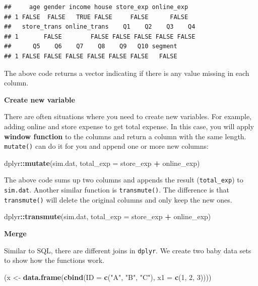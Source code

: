 \documentclass[12pt,]{krantz}
\makeatletter
\newenvironment{Shaded}{\begin{snugshade}}{\end{snugshade}}
\newcommand{\DataTypeTok}[1]{\textcolor[rgb]{0.27,0.27,0.27}{#1}}
\newcommand{\DecValTok}[1]{\textcolor[rgb]{0.06,0.06,0.06}{#1}}
\newcommand{\KeywordTok}[1]{\textcolor[rgb]{0.27,0.27,0.27}{\textbf{#1}}}
\newcommand{\NormalTok}[1]{#1}
\newcommand{\OperatorTok}[1]{\textcolor[rgb]{0.43,0.43,0.43}{\textbf{#1}}}
\newcommand{\StringTok}[1]{\textcolor[rgb]{0.5,0.5,0.5}{#1}}
\newenvironment{kframe}{%
\medskip{}
\setlength{\fboxsep}{.8em}
 \def\at@end@of@kframe{}%
 \ifinner\ifhmode%
  \def\at@end@of@kframe{\end{minipage}}%
  \begin{minipage}{\columnwidth}%
 \fi\fi%
 \def\FrameCommand##1{\hskip\@totalleftmargin \hskip-\fboxsep
 \colorbox{shadecolor}{##1}\hskip-\fboxsep
     \hskip-\linewidth \hskip-\@totalleftmargin \hskip\columnwidth}%
 \MakeFramed {\advance\hsize-\width
   \@totalleftmargin\z@ \linewidth\hsize
   \@setminipage}}%
 {\par\unskip\endMakeFramed%
 \at@end@of@kframe}
\renewenvironment{Shaded}{\begin{kframe}}{\end{kframe}}
\makeatother
\begin{document}
\begin{verbatim}
##     age gender income house store_exp online_exp
## 1 FALSE  FALSE   TRUE FALSE     FALSE      FALSE
##   store_trans online_trans    Q1    Q2    Q3    Q4
## 1       FALSE        FALSE FALSE FALSE FALSE FALSE
##      Q5    Q6    Q7    Q8    Q9   Q10 segment
## 1 FALSE FALSE FALSE FALSE FALSE FALSE   FALSE
\end{verbatim}

The above code returns a vector indicating if there is any value missing in each column.

\textbf{Create new variable}

There are often situations where you need to create new variables. For example, adding online and store expense to get total expense. In this case, you will apply \textbf{window function} to the columns and return a column with the same length. \texttt{mutate()} can do it for you and append one or more new columns:

\begin{Shaded}
\begin{Highlighting}[]
\NormalTok{dplyr}\OperatorTok{::}\KeywordTok{mutate}\NormalTok{(sim.dat, }\DataTypeTok{total_exp =}\NormalTok{ store_exp }\OperatorTok{+}\StringTok{ }\NormalTok{online_exp)}
\end{Highlighting}
\end{Shaded}

The above code sums up two columns and appends the result (\texttt{total\_exp}) to \texttt{sim.dat}. Another similar function is \texttt{transmute()}. The difference is that \texttt{transmute()} will delete the original columns and only keep the new ones.

\begin{Shaded}
\begin{Highlighting}[]
\NormalTok{dplyr}\OperatorTok{::}\KeywordTok{transmute}\NormalTok{(sim.dat, }\DataTypeTok{total_exp =}\NormalTok{ store_exp }\OperatorTok{+}\StringTok{ }\NormalTok{online_exp)}
\end{Highlighting}
\end{Shaded}

\textbf{Merge}

Similar to SQL, there are different joins in \texttt{dplyr}. We create two baby data sets to show how the functions work.

\begin{Shaded}
\begin{Highlighting}[]
\NormalTok{(x <-}\StringTok{ }\KeywordTok{data.frame}\NormalTok{(}\KeywordTok{cbind}\NormalTok{(}\DataTypeTok{ID =} \KeywordTok{c}\NormalTok{(}\StringTok{"A"}\NormalTok{, }\StringTok{"B"}\NormalTok{, }\StringTok{"C"}\NormalTok{), }\DataTypeTok{x1 =} \KeywordTok{c}\NormalTok{(}\DecValTok{1}\NormalTok{, }\DecValTok{2}\NormalTok{, }\DecValTok{3}\NormalTok{))))}
\end{Highlighting}
\end{Shaded}
\end{document}
